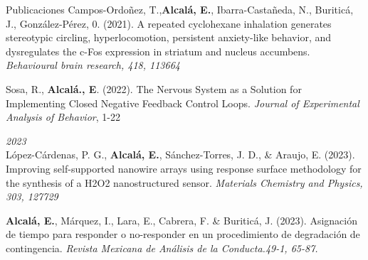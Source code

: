 \documentclass{resume} %
\begin{document}
\begin{rSection}{Publicaciones}
	Campos-Ordoñez, T.,\textbf{Alcalá, E.}, Ibarra-Castañeda, N., Buriticá, J., González-Pérez, 0. (2021). A repeated cyclohexane inhalation generates stereotypic circling, hyperlocomotion, persistent anxiety-like behavior, and dysregulates the c-Fos expression in striatum and nucleus accumbens. \textit{Behavioural brain research, 418, 113664}
	
	Sosa, R., \textbf{Alcalá., E}. (2022). The Nervous System as a Solution for Implementing Closed Negative Feedback Control Loops. \textit{Journal of Experimental Analysis of Behavior}, 1-22

	{\em 2023}\\

	López-Cárdenas, P. G.,\textbf{ Alcalá, E.}, Sánchez-Torres, J. D., \& Araujo, E. (2023). Improving self-supported nanowire arrays using response surface methodology for the synthesis of a H2O2 nanostructured sensor. \textit{Materials Chemistry and Physics, 303, 127729}
	
	\textbf{Alcalá, E.}, Márquez, I., Lara, E., Cabrera, F. \& Buriticá, J. (2023). Asignación de tiempo para responder o no-responder en un procedimiento de degradación de contingencia. \textit{Revista Mexicana de Análisis de la Conducta.49-1, 65-87.}	

	\end{rSection}
\end{document}
